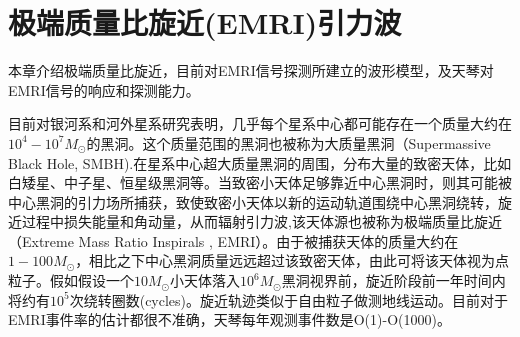 





\chapter{极端质量比旋近(EMRI)引力波}

本章介绍极端质量比旋近，目前对EMRI信号探测所建立的波形模型，及天琴对EMRI信号的响应和探测能力。


目前对银河系和河外星系研究表明，几乎每个星系中心都可能存在一个质量大约在$10^4-10^7 M_{\odot}$的黑洞。这个质量范围的黑洞也被称为大质量黑洞（Supermassive Black Hole, SMBH).在星系中心超大质量黑洞的周围，分布大量的致密天体，比如白矮星、中子星、恒星级黑洞等。当致密小天体足够靠近中心黑洞时，则其可能被中心黑洞的引力场所捕获，致使致密小天体以新的运动轨道围绕中心黑洞绕转，旋近过程中损失能量和角动量，从而辐射引力波\cite{amaro2012low,chua2017augmented},该天体源也被称为极端质量比旋近（Extreme Mass Ratio Inspirals , EMRI）。由于被捕获天体的质量大约在$1 - 100M_{\odot}$，相比之下中心黑洞质量远远超过该致密天体，由此可将该天体视为点粒子。假如假设一个$10M_{\odot}$小天体落入$10^6 M_{\odot}$黑洞视界前，旋近阶段前一年时间内将约有$10^5$次绕转圈数(cycles)。旋近轨迹类似于自由粒子做测地线运动。目前对于EMRI事件率的估计都很不准确，天琴每年观测事件数是O(1)-O(1000)\cite{Fan:2020zhy}。

